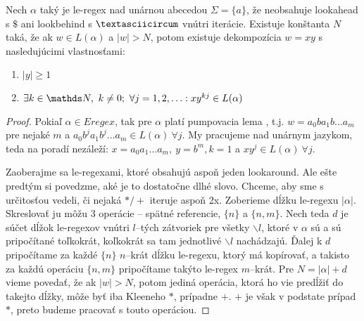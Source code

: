 \begin{veta}
Nech $\alpha$ taký je le-regex nad unárnou abecedou $\Sigma = \lbrace a \rbrace$, že neobsahuje lookahead s $\mathdollar$ ani lookbehind s $\textasciicircum$ vnútri iterácie. Existuje konštanta $N$ taká, že ak $w \in L(\alpha)$ a $\vert w \vert > N$, potom existuje dekompozícia $w=xy$ s nasledujúcimi vlastnosťami:
\begin{enumerate}
\item $\vert y \vert \geq 1$
\item $\exists k \in \N,~k\neq 0;~\forall j = 1,2,\ldots: xy^{kj} \in L(\alpha)$
\end{enumerate}
\end{veta}
\begin{proof}
Pokiaľ $\alpha \in Eregex$, tak pre $\alpha$ platí pumpovacia lema \cite[Lemma 1]{ExtendedRegexPower}, t.j. $w = a_0ba_1b\dots a_m$ pre nejaké $m$ a $a_0b^ja_1b^j\dots a_m \in L(\alpha)~\forall j$. My pracujeme nad unárnym jazykom, teda na poradí nezáleží: $x=a_0a_1\dots a_m,~y=b^m, k=1$ a $xy^j \in L(\alpha)~\forall j$.

Zaoberajme sa le-regexami, ktoré obsahujú aspoň jeden lookaround. Ale ešte predtým si povedzme, aké je to dostatočne dlhé slovo. Chceme, aby sme s určitosťou vedeli, či nejaká $*/+$ iteruje aspoň 2x. Zoberieme dĺžku le-regexu $\vert \alpha \vert$. Skreslovať ju môžu 3 ope\-rá\-cie -- spätné referencie, $\lbrace n \rbrace$ a $\lbrace n,m \rbrace$. Nech teda $d$ je súčet dĺžok le-regexov vnútri $l$--tých zátvoriek pre všetky $\backslash l$, ktoré v $\alpha$ sú a sú pripočítané toľkokrát, koľkokrát sa tam jednotlivé $\backslash l$ nachádzajú. Ďalej k $d$ pripočítame za každé $\lbrace n \rbrace$ $n$--krát dĺžku le-regexu, ktorý má kopírovať, a takisto za každú operáciu $\lbrace n,m \rbrace$ pripočítame takýto le-regex $m$--krát. Pre $N = \vert \alpha \vert + d$ vieme povedať, že ak $\vert w \vert > N$, potom jediná operácia, ktorá ho vie predĺžiť do takejto dĺžky, môže byť iba Kleeneho $*$, prípadne $+$. $+$ je však v podstate prípad $*$, preto budeme pracovať s touto operáciou.


\end{proof}
